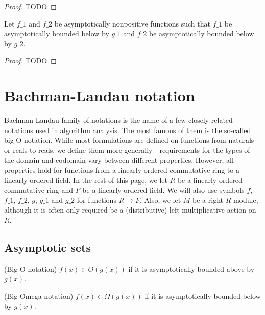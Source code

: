 \begin{proof}
    \leanok
    TODO
\end{proof}

\begin{lemma}
    \label{lemma:asymp_bounded_below_nonpos_mul}
    \leanok
    Let $f\_1$ and $f\_2$ be asymptotically nonpositive functions such that $f\_1$ 
    be asymptotically bounded below by $g\_1$ and $f\_2$ be asymptotically bounded 
    below by $g\_2$. 
\end{lemma}

\begin{proof}
    \leanok
    TODO
\end{proof}


\section{Bachman-Landau notation}

Bachman-Landau family of notations is the name of a few closely related notations used in 
algorithm analysis. The most famous of them is the so-called big-O notation. While
most formulations are defined on functions from naturals or reals to reals, we define 
them more generally - requirements for the types of the domain and codomain vary between 
different properties. However, all properties hold for functions from a linearly ordered 
commutative ring to a linearly ordered field. In the rest of this page, we let $R$ be a linearly 
ordered commutative ring and $F$ be a linearly ordered field. We will also use symbols $f$, 
$f\_1$, $f\_2$, $g$, $g\_1$ and $g\_2$ for functions $R \to F$. Also, we let $M$ be 
a right $R$-module, although it is often only required be a (distributive) left multiplicative 
action on $R$.


\subsection{Asymptotic sets}

\begin{definition}(Big O notation)
    \label{def:big_o}
    \leanok
    $f(x) \in O(g(x))$ if it is asymptotically bounded above by $g(x)$.
\end{definition}

\begin{definition}(Big Omega notation)
    \label{def:big_omega}
    \leanok
    $f(x) \in \Omega(g(x))$ if it is asymptotically bounded below by $g(x)$.
\end{definition}


